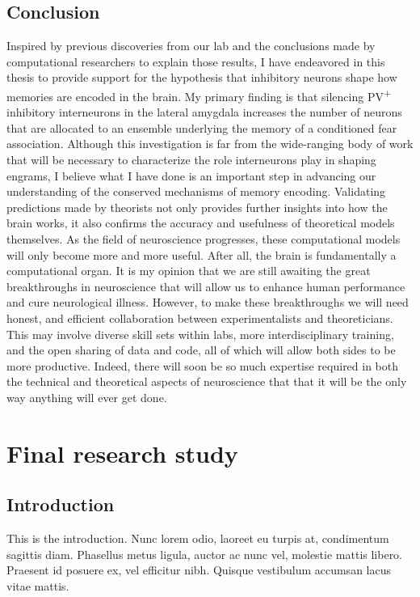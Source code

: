 \documentclass[12pt,a4paperpaper,]{report}
\begin{document}
\section{Conclusion}\label{conclusion-5}

Inspired by previous discoveries from our lab and the conclusions made
by computational researchers to explain those results, I have endeavored
in this thesis to provide support for the hypothesis that inhibitory
neurons shape how memories are encoded in the brain. My primary finding
is that silencing PV\textsuperscript{+} inhibitory interneurons in the
lateral amygdala increases the number of neurons that are allocated to
an ensemble underlying the memory of a conditioned fear association.
Although this investigation is far from the wide-ranging body of work
that will be necessary to characterize the role interneurons play in
shaping engrams, I believe what I have done is an important step in
advancing our understanding of the conserved mechanisms of memory
encoding. Validating predictions made by theorists not only provides
further insights into how the brain works, it also confirms the accuracy
and usefulness of theoretical models themselves. As the field of
neuroscience progresses, these computational models will only become
more and more useful. After all, the brain is fundamentally a
computational organ. It is my opinion that we are still awaiting the
great breakthroughs in neuroscience that will allow us to enhance human
performance and cure neurological illness. However, to make these
breakthroughs we will need honest, and efficient collaboration between
experimentalists and theoreticians. This may involve diverse skill sets
within labs, more interdisciplinary training, and the open sharing of
data and code, all of which will allow both sides to be more productive.
Indeed, there will soon be so much expertise required in both the
technical and theoretical aspects of neuroscience that that it will be
the only way anything will ever get done.

\chapter{Final research study}\label{final-research-study}

\section{Introduction}\label{introduction-5}

This is the introduction. Nunc lorem odio, laoreet eu turpis at,
condimentum sagittis diam. Phasellus metus ligula, auctor ac nunc vel,
molestie mattis libero. Praesent id posuere ex, vel efficitur nibh.
Quisque vestibulum accumsan lacus vitae mattis.
\end{document}
